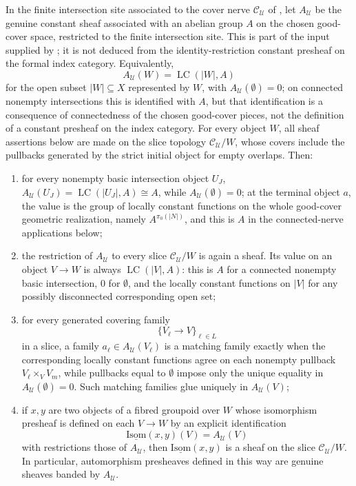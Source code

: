 \begin{lemma}\label{lem:formal-site-constant-sheaf-banding}
In the finite intersection site associated to the cover nerve $\mathcal C_{\mathcal U}$ of
, let $A_{\mathcal U}$ be the
genuine constant sheaf associated with an abelian group $A$ on the chosen
good-cover space, restricted to the finite intersection site. This is part of the
input supplied by ; it is not
deduced from the identity-restriction constant presheaf on the formal
index category. Equivalently,
\[
A_{\mathcal U}(W)=\operatorname{LC}(|W|,A)
\]
for the open subset \(|W|\subseteq X\) represented by \(W\), with
\(A_{\mathcal U}(\emptyset)=0\); on connected nonempty intersections this
is identified with \(A\), but that identification is a consequence of
connectedness of the chosen good-cover pieces, not the definition of a
constant presheaf on the index category. For every object \(W\), all sheaf
assertions below are made on the slice topology
\(\mathcal C_{\mathcal U}/W\), whose covers include the pullbacks
generated by the strict initial object for empty overlaps.
Then:
\begin{enumerate}[label=(\roman*),nosep]
\item for every nonempty basic intersection object $U_J$,
$A_{\mathcal U}(U_J)=\operatorname{LC}(|U_J|,A)\cong A$, while
$A_{\mathcal U}(\emptyset)=0$; at the terminal object \(a\), the value is
the group of locally constant functions on the whole good-cover
geometric realization, namely \(A^{\pi_0(|N|)}\), and this is \(A\) in the
connected-nerve applications below;
\item the restriction of $A_{\mathcal U}$ to every slice
$\mathcal C_{\mathcal U}/W$ is again a sheaf. Its value on an object
\(V\to W\) is always \(\operatorname{LC}(|V|,A)\): this is \(A\) for a
connected nonempty basic intersection, \(0\) for \(\emptyset\), and the
locally constant functions on \(|V|\) for any possibly disconnected
corresponding open set;
\item for every generated covering family
\[
\{V_\ell\to V\}_{\ell\in L}
\]
in a slice, a family \(a_\ell\in A_{\mathcal U}(V_\ell)\) is a matching
family exactly when the corresponding locally constant functions agree on
each nonempty pullback \(V_\ell\times_VV_m\), while pullbacks equal to
\(\emptyset\) impose only the unique equality in
\(A_{\mathcal U}(\emptyset)=0\). Such matching families glue uniquely in
\(A_{\mathcal U}(V)\);
\item if \(x,y\) are two objects of a fibred groupoid over \(W\) whose
isomorphism presheaf is defined on each \(V\to W\) by an explicit
identification
\[
\underline{\mathrm{Isom}}(x,y)(V)=A_{\mathcal U}(V)
\]
with restrictions those of \(A_{\mathcal U}\), then
\(\underline{\mathrm{Isom}}(x,y)\) is a sheaf on the slice
\(\mathcal C_{\mathcal U}/W\). In particular, automorphism presheaves
defined in this way are genuine sheaves banded by \(A_{\mathcal U}\).
\end{enumerate}
\end{lemma}

